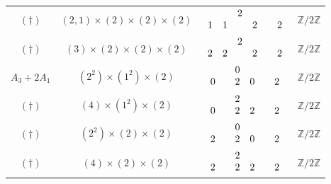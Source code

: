 \documentclass[11pt]{amsart}
\newcommand{\bZ}{{\mathbb Z}}
\numberwithin{equation}{section}
\begin{document}
\begin{center}
\begin{longtable}{|c|c|c|c|}
			$(\dagger)$ & $(2,1)\times (2)\times (2)\times (2)$ & $\renewcommand{\arraystretch}{}\begin{array}{c c c c c c}
				&  & 2 & & & \\
				1	& 1 &  & 2 &  & 2   \\
			\end{array}$ & $\bZ/2\bZ$\\
			$(\dagger)$ & $(3)\times (2)\times (2)\times (2)$ & $\renewcommand{\arraystretch}{}\begin{array}{c c c c c c}
				&  & 2 & & & \\
				2	& 2 &  & 2 &  & 2   \\
			\end{array}$ & $\bZ/2\bZ$\\
			\hline
			$A_3+2A_1$ & $(2^2)\times(1^2)\times (2)$ & $\renewcommand{\arraystretch}{}\begin{array}{c c c c c c}
				&  & 0 & & & \\
				0 &  & 2 & 0 &  & 2   \\
			\end{array}$ & $\bZ/2\bZ$\\
			$(\dagger)$ & $(4)\times (1^2)\times (2)$ & $\renewcommand{\arraystretch}{}\begin{array}{c c c c c c}
				&  & 2 & & & \\
				0 &  & 2 & 2 &  & 2   \\
			\end{array}$ & $\bZ/2\bZ$\\
			$(\dagger)$ & $(2^2)\times (2)\times (2)$ & $\renewcommand{\arraystretch}{}\begin{array}{c c c c c c}
				&  & 0 & & & \\
				2 &  & 2 & 0 &  & 2   \\
			\end{array}$ & $\bZ/2\bZ$\\
			$(\dagger)$ & $(4)\times (2)\times (2)$ & $\renewcommand{\arraystretch}{}\begin{array}{c c c c c c}
				&  & 2 & & & \\
				2 &  & 2 & 2 &  & 2   \\
			\end{array}$ & $\bZ/2\bZ$\\
			\hline
			

\end{longtable}
\end{center}
\end{document}
